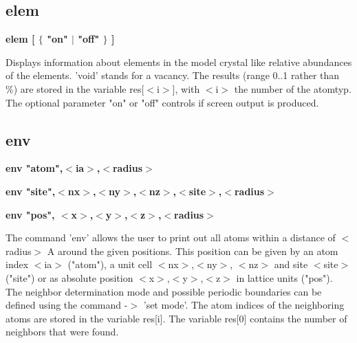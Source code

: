 \subsection*{elem}
{\bf elem [ $ \{$ "on" $| $ "off" $\} $ ] \par }
\par
\vspace{3pt}
Displays information about elements in the model crystal like 
relative abundances of the elements. 'void' stands for a vacancy. 
The results (range 0..1 rather than \%) are stored in the variable 
res[$ <$i$> $], with $ <$i$> $ the number of the atomtyp. The optional parameter 
"on" or "off" controls if screen output is produced. 
\subsection*{env}
{\bf env "atom",$ <$ia$> $,$ <$radius$> $ \par }
{\bf env "site",$ <$nx$> $,$ <$ny$> $,$ <$nz$> $,$ <$site$> $,$ <$radius$> $ \par }
{\bf env "pos", $ <$x$> $,$ <$y$> $,$ <$z$> $,$ <$radius$> $ \par }
\par
\vspace{3pt}
The command 'env' allows the user to print out all atoms within 
a distance of $ <$radius$> $ A around the given positions. This position 
can be given by an atom index $ <$ia$> $ ("atom"), a unit cell $ <$nx$> $,$ <$ny$> $, 
$ <$nz$> $ and site $ <$site$> $ ("site") or as absolute position $ <$x$> $,$ <$y$> $,$ <$z$> $ 
in lattice units ("pos"). The neighbor determination mode and 
possible periodic boundaries can be defined using the command 
-$> $ 'set mode'. The atom indices of the neighboring atoms are 
stored in the variable res[i]. The variable res[0] contains the 
number of neighbors that were found. 
